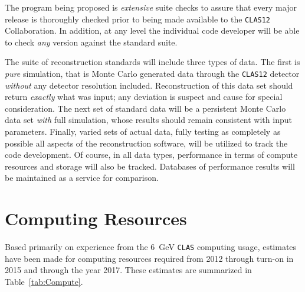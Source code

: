 The program being proposed is {\it extensive} suite checks to assure that 
every major release is thoroughly checked prior to being made available to 
the {\tt CLAS12} Collaboration.  In addition, at any level the individual 
code developer will be able to check {\it any} version against the standard 
suite. 

The suite of reconstruction standards will include three types of data. The 
first is {\it pure} simulation, that is Monte Carlo generated data through 
the {\tt CLAS12} detector {\it without} any detector resolution included.  
Reconstruction of this data set should return {\it exactly} what was input; 
any deviation is suspect and cause for special consideration. The next set 
of standard data will be a persistent Monte Carlo data set {\it with} full 
simulation, whose results should remain consistent with input parameters. 
Finally, varied sets of actual data, fully testing as completely as possible 
all aspects of the reconstruction software, will be utilized to track the 
code development. Of course, in all data types, performance in terms of 
compute resources and storage will also be tracked. Databases of performance 
results will be maintained as a service for comparison.

\section{Computing Resources}

Based primarily on experience from the 6~GeV {\tt CLAS} computing usage, 
estimates have been made for computing resources required from 2012 through 
turn-on in 2015 and through the year 2017.  These estimates are summarized in 
Table~\ref{tab:Compute}. 

